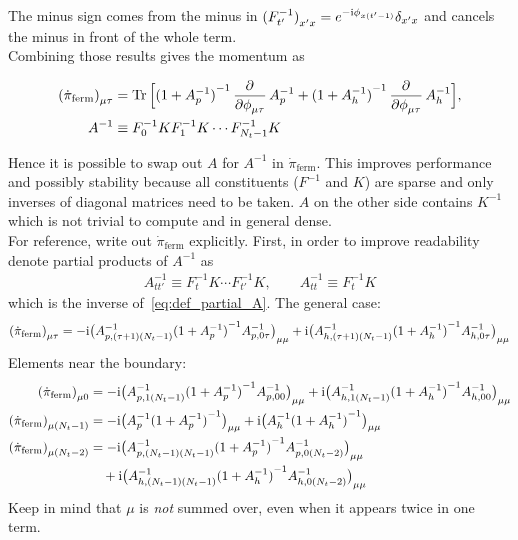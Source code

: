 \documentclass[a4paper, fleqn, twoside, notitlepage]{scrartcl}
\begin{document}
The minus sign comes from the minus in ${(F^{-1}_{t'})}_{x'x} = e^{-\mathrm{i}\phi_{x(t'-1)}}\delta_{x'x}$ and cancels the minus in front of the whole term.\\
Combining those results gives the momentum as
\begin{resultbox}
  \vspace{-\baselineskip}
  \begin{align}
    {(\dot{\pi}_{\text{ferm}})}_{\mu\tau} &= \Tr \Big[{(1+A_p^{-1})}^{-1}\dpd{}{\phi_{\mu\tau}}A_p^{-1} + {(1+A_h^{-1})}^{-1}\dpd{}{\phi_{\mu\tau}}A_h^{-1}\Big],\label{eq:force_v1}\\
    A^{-1} &\equiv F_0^{-1}K F_1^{-1}K \cdots F_{N_t-1}^{-1}K\label{eq:def_Ainv}
  \end{align}
\end{resultbox}
\noindent Hence it is possible to swap out $A$ for $A^{-1}$ in $\dot{\pi}_{\text{ferm}}$. This improves performance and possibly stability because all constituents ($F^{-1}$ and $K$) are sparse and only inverses of diagonal matrices need to be taken. $A$ on the other side contains $K^{-1}$ which is not trivial to compute and in general dense.\\

\noindent
For reference, write out $\dot{\pi}_{\text{ferm}}$ explicitly. First, in order to improve readability denote partial products of $A^{-1}$ as
\begin{align}
  A^{-1}_{tt'} \equiv F_t^{-1}K \cdots F_{t'}^{-1}K, \qquad A^{-1}_{tt} \equiv F_t^{-1}K
\end{align}
which is the inverse of~\eqref{eq:def_partial_A}.
The general case:
\begin{align}
  {(\dot{\pi}_{\text{ferm}})}_{\mu\tau} = -\mathrm{i} {\big(A^{-1}_{p,(\tau+1)(N_t-1)} {(1+A_p^{-1})}^{-1} A^{-1}_{p,0\tau}\big)}_{\mu\mu} + \mathrm{i} {\big(A^{-1}_{h,(\tau+1)(N_t-1)} {(1+A_h^{-1})}^{-1} A^{-1}_{h,0\tau}\big)}_{\mu\mu}
\end{align}
Elements near the boundary:
\begin{align}
  {(\dot{\pi}_{\text{ferm}})}_{\mu0} &= -\mathrm{i} {\big(A^{-1}_{p,1(N_t-1)} {(1+A_p^{-1})}^{-1} A^{-1}_{p,00}\big)}_{\mu\mu} + \mathrm{i} {\big(A^{-1}_{h,1(N_t-1)} {(1+A_h^{-1})}^{-1} A^{-1}_{h,00}\big)}_{\mu\mu}\\
  {(\dot{\pi}_{\text{ferm}})}_{\mu(N_t-1)} &= -\mathrm{i} {\big(A^{-1}_{p} {(1+A_p^{-1})}^{-1}\big)}_{\mu\mu} + \mathrm{i} {\big(A^{-1}_{h} {(1+A_h^{-1})}^{-1}\big)}_{\mu\mu}\\
  {(\dot{\pi}_{\text{ferm}})}_{\mu(N_t-2)} &= -\mathrm{i} {\big(A^{-1}_{p,(N_t-1)(N_t-1)} {(1+A_p^{-1})}^{-1} A^{-1}_{p,0(N_t-2)}\big)}_{\mu\mu} \nonumber\\
                                 &\quad + \mathrm{i} {\big(A^{-1}_{h,(N_t-1)(N_t-1)} {(1+A_h^{-1})}^{-1} A^{-1}_{h,0(N_t-2)}\big)}_{\mu\mu}
\end{align}
Keep in mind that $\mu$ is \emph{not} summed over, even when it appears twice in one term.
\end{document}
